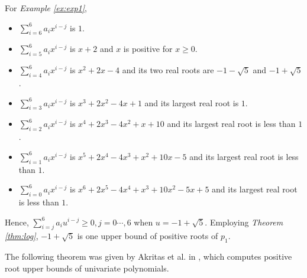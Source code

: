 For {\em Example \ref{ex:exp1}},
	\begin{itemize}
			\item  $\sum_{i=6}^6 a_i x^{i-j}$ is $1$.
		\item  $\sum_{i=5}^6 a_i x^{i-j}$ is $x+2$ and $x$ is positive for $x\ge0$.
		\item  	$\sum_{i=4}^6 a_i x^{i-j}$ is $x^2+2x-4$ and its
		two real roots are $-1-\sqrt{5}$ and $-1+\sqrt{5}$.
		\item $\sum_{i=3}^6 a_i x^{i-j}$ is $x^3+2x^2-4x+1$ and its largest real root is  $1$.
		\item  $\sum_{i=2}^6 a_i x^{i-j}$ is $x^4+2x^3-4x^2+x+10$  and  its largest real root is less than $1$.
			\item  $\sum_{i=1}^6 a_i x^{i-j}$ is $x^5+2x^4-4x^3+x^2+10x-5$  and  its largest real root is less than $1$.
				\item  $\sum_{i=0}^6 a_i x^{i-j}$ is $x^6+2x^5-4x^4+x^3+10x^2-5x+5$  and  its largest real root is less than $1$.
	\end{itemize}
	 Hence, $  \sum_{i=j}^6 a_i u^{i-j} \ge 0, j=0\cdots,6$ when   $u=-1+\sqrt{5}$. Employing {\em Theorem \ref{thm:log}}, $-1+\sqrt{5}$ is one  upper bound of positive roots of $p_1$.



The following theorem was given by Akritas et al. in  \cite{akr08}, which computes positive root upper bounds of univariate polynomials.

